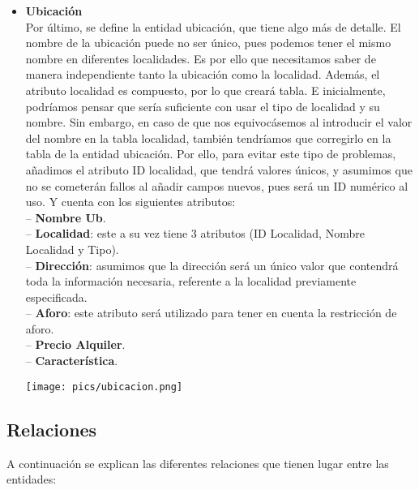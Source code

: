 \documentclass[12pt]{article}
\begin{document}
\begin{itemize}
        \item \textbf{Ubicación}\\
            Por último, se define la entidad ubicación, que tiene algo más de detalle. El nombre de la ubicación puede no ser único, pues podemos tener el mismo
            nombre en diferentes localidades. Es por ello que necesitamos saber de manera independiente tanto la ubicación como la localidad.
            Además, el atributo localidad es compuesto, por lo que creará tabla. E inicialmente, podríamos pensar que sería suficiente con usar el tipo de localidad 
            y su nombre. Sin embargo, en caso de que nos equivocásemos al introducir el valor del nombre en la tabla localidad, también tendríamos que corregirlo
            en la tabla de la entidad ubicación. Por ello, para evitar este tipo de problemas, añadimos el atributo ID localidad, que tendrá valores únicos, 
            y asumimos que no se cometerán fallos al añadir campos nuevos, pues será un ID numérico al uso. 
            Y cuenta con los siguientes atributos: \\
                \hspace{0.5cm} -- {\bfseries Nombre Ub}. \\
                \hspace{0.5cm} -- {\bfseries Localidad}: este a su vez tiene 3 atributos (ID Localidad, Nombre Localidad y Tipo). \\
                \hspace{0.5cm} -- {\bfseries Dirección}: asumimos que la dirección será un único valor que contendrá toda la información necesaria,
                referente a la localidad previamente especificada. \\
                \hspace{0.5cm} -- {\bfseries Aforo}: este atributo será utilizado para tener en cuenta la restricción de aforo. \\
                \hspace{0.5cm} -- {\bfseries Precio Alquiler}. \\
                \hspace{0.5cm} -- {\bfseries Característica}.
            \begin{center}
            {\texttt{[image: pics/ubicacion.png]}}
            \end{center}

    \end{itemize}

    \newpage
    \subsection{Relaciones}
    A continuación se explican las diferentes relaciones que tienen lugar entre las entidades:
\end{document}

